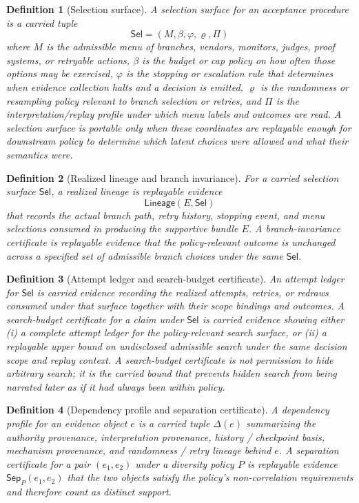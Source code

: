\documentclass[11pt]{article}
\newtheorem{definition}{Definition}
\theoremstyle{remark}
\newcommand{\Sel}{\mathsf{Sel}}
\newcommand{\Lineage}{\mathsf{Lineage}}
\newcommand{\Sep}{\mathsf{Sep}}
\begin{document}
\begin{definition}[Selection surface]
A selection surface for an acceptance procedure is a carried tuple
\[
  \Sel=(M,\beta,\varphi,\varrho,\Pi)
\]
where $M$ is the admissible menu of branches, vendors, monitors, judges, proof systems, or retryable actions,
$\beta$ is the budget or cap policy on how often those options may be exercised,
$\varphi$ is the stopping or escalation rule that determines when evidence collection halts and a decision is emitted,
$\varrho$ is the randomness or resampling policy relevant to branch selection or retries,
and $\Pi$ is the interpretation/replay profile under which menu labels and outcomes are read.
A selection surface is portable only when these coordinates are replayable enough for downstream policy to determine which latent choices were allowed and what their semantics were.
\end{definition}

\begin{definition}[Realized lineage and branch invariance]
For a carried selection surface $\Sel$, a realized lineage is replayable evidence
\[
\Lineage(E,\Sel)
\]
that records the actual branch path, retry history, stopping event, and menu selections consumed in producing the supportive bundle $E$.
A branch-invariance certificate is replayable evidence that the policy-relevant outcome is unchanged across a specified set of admissible branch choices under the same $\Sel$.
\end{definition}

\begin{definition}[Attempt ledger and search-budget certificate]
An attempt ledger for $\Sel$ is carried evidence recording the realized attempts, retries, or redraws consumed under that surface together with their scope bindings and outcomes.
A search-budget certificate for a claim under $\Sel$ is carried evidence showing either
(i) a complete attempt ledger for the policy-relevant search surface, or
(ii) a replayable upper bound on undisclosed admissible search under the same decision scope and replay context.
A search-budget certificate is not permission to hide arbitrary search; it is the carried bound that prevents hidden search from being narrated later as if it had always been within policy.
\end{definition}

\begin{definition}[Dependency profile and separation certificate]
A dependency profile for an evidence object $e$ is a carried tuple $\Delta(e)$ summarizing the authority provenance, interpretation provenance, history / checkpoint basis, mechanism provenance, and randomness / retry lineage behind $e$.
A separation certificate for a pair $(e_1,e_2)$ under a diversity policy $P$ is replayable evidence $\Sep_P(e_1,e_2)$ that the two objects satisfy the policy's non-correlation requirements and therefore count as distinct support.
\end{definition}
\end{document}
